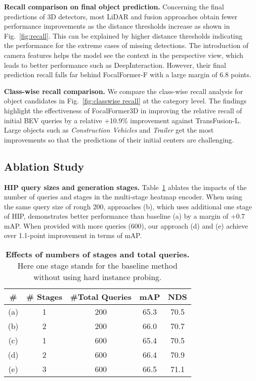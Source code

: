\documentclass[10pt,twocolumn,letterpaper]{article}
\begin{document}
\vspace{2mm}
\noindent\textbf{Recall comparison on final object prediction.}
Concerning the final predictions of 3D detectors, most LiDAR and fusion approaches obtain fewer performance improvements as the distance thresholds increase as shown in Fig.~\ref{fig:recall}. This can be explained by higher distance thresholds indicating the performance for the extreme cases of missing detections. The introduction of camera features helps the model see the context in the perspective view, which leads to better performance such as DeepInteraction. However, their final prediction recall falls far behind FocalFormer-F with a large margin of 6.8 points. 

\vspace{2mm}
\noindent\textbf{Class-wise recall comparison.}
We compare the class-wise recall analysis for object candidates in Fig.~\ref{fig:classwise recall} at the category level. The findings highlight the effectiveness of FocalFormer3D in improving the relative recall of initial BEV queries by a relative +10.9\% improvement against TransFusion-L. Large objects such as \textsl{Construction Vehicles} and \textsl{Trailer} get the most improvements so that the predictions of their initial centers are challenging.

\subsection{Ablation Study}

\vspace{2mm}
\noindent\textbf{HIP query sizes and generation stages.}
Table~\ref{tab: stages comparison} ablates the impacts of the number of queries and stages in the multi-stage heatmap encoder. When using the same query size of rough 200, approaches (b), which uses additional one stage of HIP, demonstrates better performance than baseline (a) by a margin of $+0.7$ mAP. When provided with more queries (600), our approach (d) and (e) achieve over 1.1-point improvement in terms of mAP. 

\begin{table}[bpt]
	\begin{center}
		\begin{tabular}{ccccc}
			\toprule
		\# & \# Stages & \#Total Queries  & mAP & NDS \\ \midrule
            (a) & 1 & 200 & 65.3 & 70.5 \\
            (b) & 2 & 200 & 66.0 & 70.7 \\
            (c) & 1 & 600 & 65.4 & 70.5 \\
            (d) & 2 & 600 & 66.4 & 70.9 \\
            (e) & 3 & 600 & 66.5 & 71.1 \\
			\bottomrule
		\end{tabular}
	\end{center}
	\caption{\textbf{Effects of numbers of stages and total queries.} Here one stage stands for the baseline method without using hard instance probing. } \label{tab: stages comparison}
\end{table}
\end{document}

